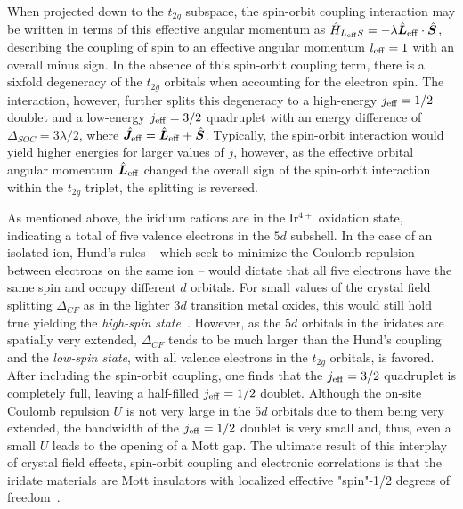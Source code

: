 When projected down to the $t_{2g}$ subspace, the spin-orbit coupling interaction may be written in terms of this effective angular momentum as $\hat{H}_{L_{\rm eff} S} = -\lambda \hat{\bm{L}}_{\rm eff} \cdot \hat{\bm{S}}$, describing the coupling of spin to an effective angular momentum $l_{\rm eff} = 1$ with an overall minus sign.
In the absence of this spin-orbit coupling term, there is a sixfold degeneracy of the $t_{2g}$ orbitals when accounting for the electron spin.
The interaction, however, further splits this degeneracy to a high-energy $j_{\rm eff} = 1/2$ doublet and a low-energy $j_{\rm eff} = 3/2$ quadruplet with an energy difference of $\Delta_{SOC} = 3\lambda/2$, where $\hat{\bm J}_{\rm eff} = \hat{\bm{L}}_{\rm eff} + \hat{\bm{S}}$.
Typically, the spin-orbit interaction would yield higher energies for larger values of $j$, however, as the effective orbital angular momentum $\hat{\bm{L}}_{\rm eff}$ changed the overall sign of the spin-orbit interaction within the $t_{2g}$ triplet, the splitting is reversed.

As mentioned above, the iridium cations are in the Ir$^{4+}$ oxidation state,  indicating a total of five valence electrons in the $5d$ subshell.
In the case of an isolated ion, Hund's rules -- which seek to minimize the Coulomb repulsion between electrons on the same ion -- would dictate that all five electrons have the same spin and occupy different $d$ orbitals.
For small values of the crystal field splitting $\Delta_{CF}$ as in the lighter $3d$ transition metal oxides, this would still hold true yielding the \textit{high-spin state}~\cite{Khomskii2014}.
However, as the $5d$ orbitals in the iridates are spatially very extended, $\Delta_{CF}$ tends to be much larger than the Hund's coupling and the \textit{low-spin state}, with all valence electrons in the $t_{2g}$ orbitals, is favored.
After including the spin-orbit coupling, one finds that the $j_{\rm eff} = 3/2$ quadruplet is completely full, leaving a half-filled $j_{\rm eff} = 1/2$ doublet.
Although the on-site Coulomb repulsion $U$ is not very large in the 5$d$ orbitals due to them being very extended, the bandwidth of the $j_{\rm eff} = 1/2$ doublet is very small and, thus, even a small $U$ leads to the opening of a Mott gap.
The ultimate result of this interplay of crystal field effects, spin-orbit coupling and electronic correlations is that the iridate materials are Mott insulators with localized effective "spin"-1/2 degrees of freedom~\cite{KimPRL2008,KimSci2009}.


%
%
